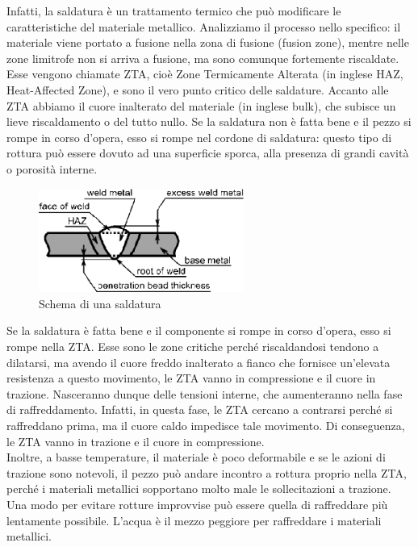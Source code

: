 Infatti, la saldatura è un trattamento termico che può modificare le caratteristiche del materiale metallico. Analizziamo il processo nello specifico: il materiale viene portato a fusione nella zona di fusione (fusion zone), mentre nelle zone limitrofe non si arriva a fusione, ma sono comunque fortemente riscaldate. Esse vengono chiamate ZTA, cioè Zone Termicamente Alterata (in inglese HAZ, Heat-Affected Zone), e sono il vero punto critico delle saldature. Accanto alle ZTA abbiamo il cuore inalterato del materiale (in inglese bulk), che
subisce un lieve riscaldamento o del tutto nullo. Se la saldatura non è fatta bene e il pezzo si rompe in corso d’opera, esso si rompe nel cordone di saldatura: questo tipo di rottura può essere dovuto ad una superficie sporca, alla presenza di grandi cavità o porosità interne.
\begin{figure}[hb]
    \includegraphics[width=0.6\textwidth]{images/img6.png}
    \caption[Schema saldatura]{Schema di una saldatura}
\end{figure}

Se la saldatura è fatta bene e il componente si rompe in corso d’opera, esso si rompe nella ZTA. Esse sono le zone critiche perché riscaldandosi tendono a dilatarsi, ma avendo il cuore freddo inalterato a fianco che fornisce un’elevata resistenza a questo movimento, le ZTA vanno in compressione e il cuore in trazione. Nasceranno dunque delle tensioni interne, che aumenteranno nella fase di raffreddamento. Infatti, in questa fase, le ZTA cercano a contrarsi perché si raffreddano prima, ma il cuore caldo impedisce tale movimento. Di conseguenza, le ZTA vanno in trazione e il cuore in compressione.\\
Inoltre, a basse temperature, il materiale è poco deformabile e se le azioni di trazione sono notevoli, il pezzo può andare incontro a rottura proprio nella ZTA, perché i materiali metallici sopportano molto male le sollecitazioni a trazione. Una modo per evitare rotture improvvise può essere quella di raffreddare più lentamente possibile. L’acqua è il mezzo peggiore per raffreddare i materiali metallici.

